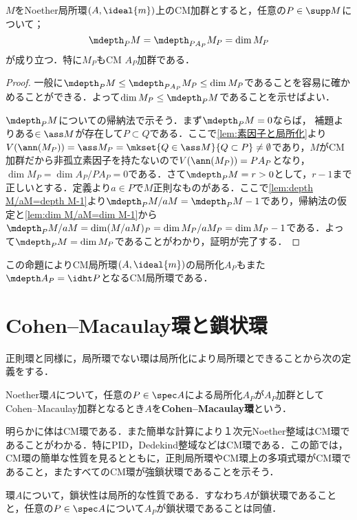 \begin{prop}\label{prop:CMの局所化もCM}
	$M$をNoether局所環$(A,\ideal{m})$上のCM加群とすると，任意の$P\in\supp M$について；
	\[\mdepth_P M=\mdepth_{PA_P} M_P=\dim M_P\]
	が成り立つ．特に$M_P$もCM $A_P$加群である．
\end{prop}

\begin{proof}
	一般に$\mdepth_P M\leq\mdepth_{PA_P}M_P\leq\dim M_P$であることを容易に確かめることができる．よって$\dim M_P\leq\mdepth_P M$であることを示せばよい．
	
	$\mdepth_P M$についての帰納法で示そう．まず$\mdepth_P M=0$ならば，
	補題よりある$\in\ass M$が存在して$P\subset Q$である．ここで\ref{lem:素因子と局所化}より$V(\ann (M_P))=\ass M_P=\mkset{Q\in\ass M}{Q\subset P}\neq\emptyset$であり，$M$がCM加群だから非孤立素因子を持たないので$V(\ann(M_P))=PA_P$となり，$\dim M_P=\dim A_P/PA_P=0$である．さて$\mdepth_P M=r>0$として，$r-1$まで正しいとする．定義より$a\in P$で$M$正則なものがある．ここで\ref{lem:depth M/aM=depth M-1}より$\mdepth_P M/aM=\mdepth_P M-1$であり，帰納法の仮定と\ref{lem:dim M/aM=dim M-1}から$\mdepth_P M/aM=\dim (M/aM)_P=\dim M_P/aM_P=\dim M_P-1$である．よって$\mdepth_P M=\dim M_P$であることがわかり，証明が完了する．	
\end{proof}

この命題によりCM局所環$(A,\ideal{m})$の局所化$A_P$もまた$\mdepth A_P=\idht P$となるCM局所環である．
\section{Cohen--Macaulay環と鎖状環}

正則環と同様に，局所環でない環は局所化により局所環とできることから次の定義をする．
\begin{defi}
	Noether環$A$について，任意の$P\in\spec A$による局所化$A_P$が$A_P$加群としてCohen--Macaulay加群となるとき$A$を\textbf{Cohen--Macaulay環}という．
\end{defi}

明らかに体はCM環である．また簡単な計算により１次元Noether整域はCM環であることがわかる．特にPID，Dedekind整域などはCM環である．この節では，CM環の簡単な性質を見るとともに，正則局所環やCM環上の多項式環がCM環であること，またすべてのCM環が強鎖状環であることを示そう．

\begin{prop}
	環$A$について，鎖状性は局所的な性質である．すなわち$A$が鎖状環であることと，任意の$P\in\spec A$について$A_P$が鎖状環であることは同値．
\end{prop}

